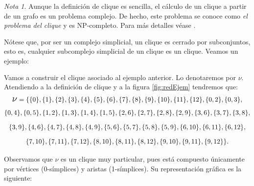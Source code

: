 \documentclass[12pt, a4paper, twoside]{book}
\numberwithin{equation}{section}
\theoremstyle{definition}
\newenvironment{ejem}
  {\pushQED{\qed}\renewcommand{\qedsymbol}{$\blacktriangleleft$}\ejemplo}
  {\popQED\endejemplo}
\theoremstyle{remark}
\newtheorem*{remark}{Nota}
\theoremstyle{plain}
\begin{document}
	\begin{remark}
		Aunque la definición de clique es sencilla, el cálculo de un 
		clique a partir de un grafo es un problema complejo. De hecho,
		este problema se conoce como \emph{el problema del clique} y 
		es NP-completo. Para más detalles véase \cite{NP-Karp}.
	\end{remark}

	Nótese que, por ser un complejo simplicial, un clique es cerrado por 
	subconjuntos, esto es, cualquier subcomplejo simplicial de un clique 
	es un clique. Veamos un ejemplo:

	\begin{ejem}
		Vamos a construir el clique asociado al ejemplo anterior. Lo
		denotaremos por {\Large $\nu$}. Atendiendo a la definición de 
		clique y a la figura \ref{fig:redEjem} tendremos que:
		\begin{multline*} 
			\text{{\Large $\nu$}}=\{\{0\},\{1\},\{2\},\{3\},
			\{4\},\{5\},\{6\},\{7\},\{8\},\{9\},
			\{10\},\{11\},\{12\},\{0,2\},\{0,3\},\\
			\{0,4\},\{0,5\},
			\{1,2\},\{1,3\},\{1,4\},\{1,5\},\{2,6\},\{2,7\},
			\{2,8\},\{2,9\},\{3,6\},\{3,7\},\{3,8\},\\\{3,9\},
			\{4,6\},\{4,7\},\{4,8\},\{4,9\},\{5,6\},\{5,7\},
			\{5,8\},\{5,9\},\{6,10\},\{6,11\},
			\{6,12\},\\\{7,10\},\{7,11\},
			\{7,12\},\{8,10\},\{8,11\},
			\{8,12\},\{9,10\},\{9,11\},
			\{9,12\}\}.
		\end{multline*}

		Observamos que {\Large $\nu$} es un clique muy particular, 
		pues está compuesto únicamente por vértices ($0$-símplices) y 
		aristas (1-símplices). Su representación gráfica es la 
		siguiente:
		\begin{figure}[H]
			\centering
\end{figure}
\end{ejem}
\end{document}
